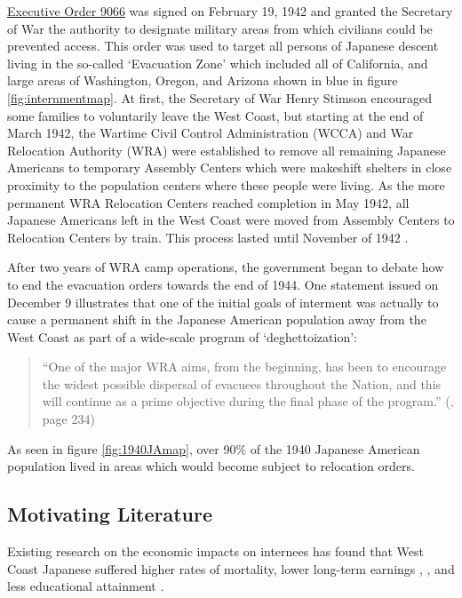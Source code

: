 \documentclass[12pt]{article}
\begin{document}
\href{https://www.archives.gov/milestone-documents/executive-order-9066}{Executive Order 9066} 
was signed on February 19, 1942 and granted the Secretary of War the authority
to designate military areas from which civilians could be prevented access. This
order was used to target all persons of Japanese descent living in the so-called
`Evacuation Zone' which included all of California, and large areas of
Washington, Oregon, and Arizona shown in blue in figure \ref{fig:internmentmap}.
At first, the Secretary of War Henry Stimson encouraged some families to
voluntarily leave the West Coast, but starting at the end of March 1942, the
Wartime Civil Control Administration (WCCA) and War Relocation Authority (WRA)
were established to remove all remaining Japanese Americans to temporary
Assembly Centers which were makeshift shelters in close proximity to the
population centers where these people were living. As the more permanent WRA
Relocation Centers reached completion in May 1942, all Japanese Americans left
in the West Coast were moved from Assembly Centers to Relocation Centers by
train. This process lasted until November of 1942
\citep{commission_on_wartime_relocation_personal_1983}.

After two years of WRA camp operations, the government began to debate how to
end the evacuation orders towards the end of 1944. One statement issued on
December 9 illustrates that one of the initial goals of interment was actually
to cause a permanent shift in the Japanese American population away from the
West Coast as part of a wide-scale program of `deghettoization':
\begin{quote}
  ``One of the major WRA aims, from the beginning, has been to encourage the widest possible dispersal of evacuees throughout the Nation, and this will continue as a prime objective during the final phase of the program.''
  (\cite{commission_on_wartime_relocation_personal_1983}, page 234)
\end{quote}

As seen in figure \ref{fig:1940JAmap}, over 90\% of the 1940 Japanese American
population lived in areas which would become subject to relocation orders.

\subsection{Motivating Literature}\label{motivation}

Existing research on the economic impacts on internees has found that
West Coast Japanese suffered higher rates of mortality, lower long-term earnings
\citep{chin_longrun_2005}, 
\citep{saavedra_early_2013},
and less educational attainment 
\citep{saavedra_school_2015}. 
\end{document}
